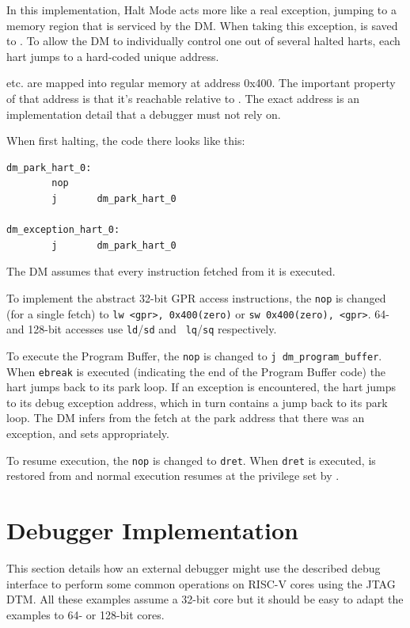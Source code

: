 \documentclass{article}
\begin{document}
In this implementation, Halt Mode acts more like a real exception, jumping to a
memory region that is serviced by the DM. When taking this exception, \Rpc is
saved to \Rdpc. To allow the DM to individually control one out of several
halted harts, each hart jumps to a hard-coded unique address.

\Rdatazero etc. are mapped into regular memory at address 0x400. The important
property of that address is that it's reachable relative to \Rzero. The exact
address is an implementation detail that a debugger must not rely on.

When first halting, the code there looks like this:
\begin{verbatim}
dm_park_hart_0:
        nop
        j       dm_park_hart_0

dm_exception_hart_0:
        j       dm_park_hart_0
\end{verbatim}

The DM assumes that every instruction fetched from it is executed.

To implement the abstract 32-bit GPR access instructions, the {\tt nop} is
changed (for a single fetch) to {\tt lw <gpr>, 0x400(zero)} or {\tt sw
0x400(zero), <gpr>}. 64- and 128-bit accesses use {\tt ld}/{\tt sd} and {\tt
lq}/{\tt sq} respectively.

To execute the Program Buffer, the {\tt nop} is changed to {\tt j
dm\_program\_buffer}. When {\tt ebreak} is executed (indicating the end of the
Program Buffer code) the hart jumps back to its park loop. If an exception is
encountered, the hart jumps to its debug exception address, which in turn
contains a jump back to its park loop. The DM infers from the fetch at the park
address that there was an exception, and sets \Fcmderr appropriately.

To resume execution, the {\tt nop} is changed to {\tt dret}.  When {\tt dret}
is executed, \Rpc is restored from \Rdpc and normal execution resumes at the
privilege set by \Fprv.

\section{Debugger Implementation}

This section details how an external debugger might use the described debug
interface to perform some common operations on RISC-V cores using the JTAG DTM.
All these examples assume a 32-bit core but it should be easy to adapt the
examples to 64- or 128-bit cores.
\end{document}
